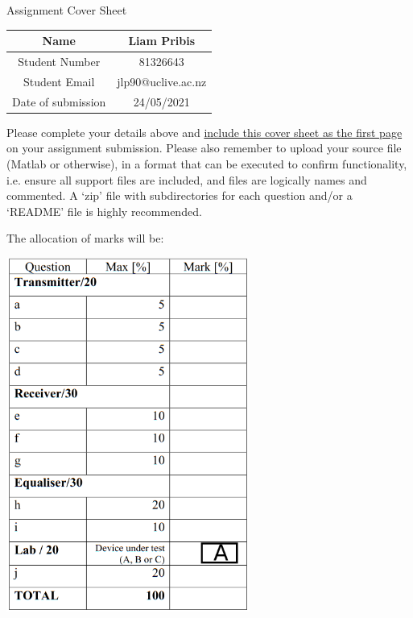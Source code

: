 \begin{center}
    {\Huge Assignment Cover Sheet}

    \begin{tabular}{|c|c|}
        \hline
        Name               & Liam Pribis        \\
        \hline
        Student Number     & 81326643           \\
        \hline
        Student Email      & jlp90@uclive.ac.nz \\
        \hline
        Date of submission & 24/05/2021         \\
        \hline
    \end{tabular}
\end{center}
Please complete your details above and \ul{include this cover sheet as the first
    page} on your assignment submission. Please also remember to upload your source
file (Matlab or otherwise), in a format that can be executed  to confirm
functionality, i.e.  ensure all  support files  are included,  and files are
logically names and commented.  A ‘zip’ file with subdirectories for each
question and/or a ‘README’ file is highly recommended.

The allocation of marks will be:

\begin{center}
    \includegraphics[width=0.6\textwidth, keepaspectratio]{marks_table.png}
\end{center}